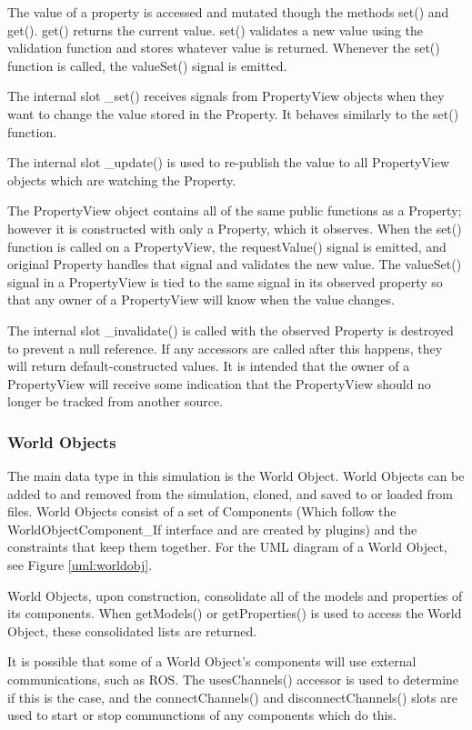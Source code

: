  	The value of a property is accessed and mutated though the methods set() and get(). get() returns the current value. set() validates a new value using the validation function and stores whatever value is returned. Whenever the set() function is called, the valueSet() signal is emitted.
 	
 	The internal slot \_set() receives signals from PropertyView objects when they want to change the value stored in the Property. It behaves similarly to the set() function.
 	
 	The internal slot \_update() is used to re-publish the value to all PropertyView objects which are watching the Property.
 	
 	The PropertyView object contains all of the same public functions as a Property; however it is constructed with only a Property, which it observes. When the set() function is called on a PropertyView, the requestValue() signal is emitted, and original Property handles that signal and validates the new value. The valueSet() signal in a PropertyView is tied to the same signal in its observed property so that any owner of a PropertyView will know when the value changes.
 	
 	The internal slot \_invalidate() is called with the observed Property is destroyed to prevent a null reference. If any accessors are called after this happens, they will return default-constructed values. It is intended that the owner of a PropertyView will receive some indication that the PropertyView should no longer be tracked from another source.
 	
  \subsubsection{World Objects} \label{sec:worldobjclass}
	The main data type in this simulation is the World Object. World Objects can be added to and removed from the simulation, cloned, and saved to or loaded from files. World Objects consist of a set of Components (Which follow the WorldObjectComponent\_If interface and are created by plugins) and the constraints that keep them together. For the UML diagram of a World Object, see Figure \ref{uml:worldobj}.
	
	World Objects, upon construction, consolidate all of the models and properties of its components. When getModels() or getProperties() is used to access the World Object, these consolidated lists are returned.
	
	It is possible that some of a World Object's components will use external communications, such as ROS. The usesChannels() accessor is used to determine if this is the case, and the connectChannels() and disconnectChannels() slots are used to start or stop communctions of any components which do this.
	
